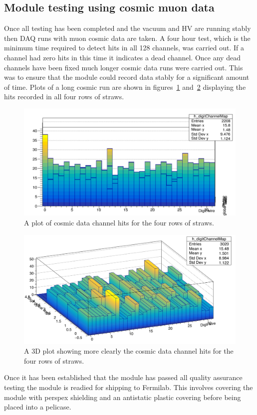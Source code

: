 \subsection{ Module testing using cosmic muon data}

Once all testing has been completed and the vacuum and HV are running stably then DAQ runs with muon cosmic data are taken. A four hour test, which is the minimum time required to detect hits in all 128 channels, was carried out. If a channel had zero hits in this time it indicates a dead channel. Once any dead channels have been fixed much longer cosmic data runs were carried out. This was to ensure that the module could record data stably for a significant amount of time. Plots of a long cosmic run are shown in figures~\ref{fig:cosmicdata1} and~\ref{fig:cosmic4rows} displaying the hits recorded in all four rows of straws.

\begin{figure}[ht]
\centering
\includegraphics[scale=0.65]{Figures/cosmicdata1}
\decoRule
\caption{A plot of cosmic data channel hits for the four rows of straws.}
\label{fig:cosmicdata1}
\end{figure}

\begin{figure}[ht]
\centering
\includegraphics[scale=0.4]{Figures/cosmic4rows.png}
\decoRule
\caption{A 3D plot showing more clearly the cosmic data channel hits for the four rows of straws.}
\label{fig:cosmic4rows}
\end{figure}

Once it has been established that the module has passed all quality assurance testing the module is readied for shipping to Fermilab. This involves covering the module with perspex shielding and an antistatic plastic covering before being placed into a pelicase.


